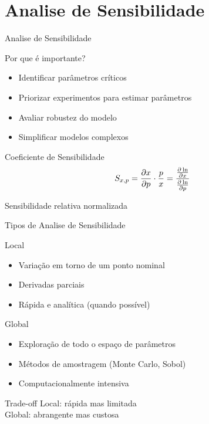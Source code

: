 \section{Analise de Sensibilidade}

\begin{frame}[allowframebreaks]{Analise de Sensibilidade}

\vspace{0.3cm}

\begin{block}{Por que é importante?}
\begin{itemize}
    \item Identificar parâmetros críticos
    \item Priorizar experimentos para estimar parâmetros
    \item Avaliar robustez do modelo
    \item Simplificar modelos complexos
\end{itemize}
\end{block}

\begin{exampleblock}{Coeficiente de Sensibilidade}
\begin{equation*}
S_{x,p} = \frac{\partial x}{\partial p} \cdot \frac{p}{x} = \frac{\frac{\partial \ln}{\partial x}}{\frac{\partial \ln}{\partial p}}
\end{equation*}

Sensibilidade relativa normalizada
\end{exampleblock}
\end{frame}

\begin{frame}[allowframebreaks]{Tipos de Analise de Sensibilidade}
\begin{block}{Local}
\begin{itemize}
    \item Variação em torno de um ponto nominal
    \item Derivadas parciais
    \item Rápida e analítica (quando possível)
\end{itemize}
\end{block}

\begin{block}{Global}
\begin{itemize}
    \item Exploração de todo o espaço de parâmetros
    \item Métodos de amostragem (Monte Carlo, Sobol)
    \item Computacionalmente intensiva
\end{itemize}
\end{block}

\begin{alertblock}{Trade-off}
Local: rápida mas limitada \\
Global: abrangente mas custosa
\end{alertblock}
\end{frame}

